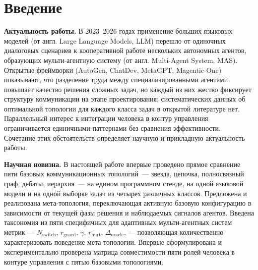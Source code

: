 %

\section*{Введение}

\textbf{Актуальность работы.} В 2023--2026 годах применение больших
языковых моделей (от англ. Large Language Models, LLM) перешло от
одиночных диалоговых сценариев к кооперативной работе нескольких
автономных агентов, образующих мульти-агентную систему
(от англ. Multi-Agent System, MAS). Открытые фреймворки (AutoGen,
ChatDev, MetaGPT, Magentic-One) показывают, что разделение труда
между специализированными агентами повышает качество решения
сложных задач, но каждый из них жестко фиксирует структуру
коммуникации на этапе проектирования; систематических данных об
оптимальной топологии для каждого класса задач в открытой литературе
нет. Параллельный интерес к интеграции человека в контур управления
ограничивается единичными паттернами без сравнения эффективности.
Сочетание этих обстоятельств определяет научную и прикладную
актуальность работы.

\textbf{Научная новизна.} В настоящей работе впервые проведено
прямое сравнение пяти базовых коммуникационных топологий~---
звезда, цепочка, полносвязный граф, дебаты, иерархия~--- на
едином программном стенде, на одной языковой модели и на одной
выборке задач из четырех различных классов. Предложена и
реализована мета-топология, переключающая активную базовую
конфигурацию в зависимости от текущей фазы решения и наблюдаемых
сигналов агентов. Введена таксономия из пяти специфичных для
адаптивных мульти-агентных систем метрик ---
$N_{\text{switch}}$, $r_{\text{guard}}$, $\gamma$,
$r_{\text{hurt}}$, $\Delta_{\text{oracle}}$, --- позволяющая
количественно характеризовать поведение мета-топологии. Впервые
сформулирована и экспериментально проверена матрица совместимости
пяти ролей человека в контуре управления с пятью базовыми
топологиями.

